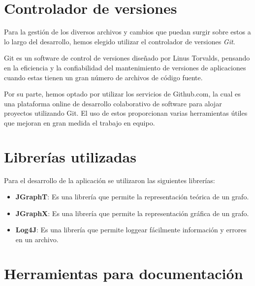 \documentclass{book}
\begin{document}
\section{Controlador de versiones}

Para la gestión de los diversos archivos y cambios que puedan surgir sobre estos a lo largo del desarrollo, hemos elegido utilizar el controlador de versiones \textit{Git}. 
\par
Git es un software de control de versiones diseñado por Linus Torvalds, pensando en la eficiencia y la confiabilidad del mantenimiento de versiones de aplicaciones cuando estas tienen un gran número de archivos de código fuente.
\par
Por su parte, hemos optado por utilizar los servicios de Github.com, la cual es una plataforma online de desarrollo colaborativo de software para alojar proyectos utilizando Git. El uso de estos proporcionan varias herramientas útiles que mejoran en gran medida el trabajo en equipo.
\medskip

\section{Librerías utilizadas}
Para el desarrollo de la aplicación se utilizaron las siguientes librerías:
\begin{itemize}
		\renewcommand{\labelitemi}{\scriptsize\tiny$\blacksquare$} 
		\itemsep=10pt \topsep=0pt \partopsep=0pt \parskip=0pt \parsep=10pt
		
		\item \textbf{JGraphT}: Es una librería que permite la representación teórica de un grafo.
		
		\item \textbf{JGraphX}: Es una librería que permite la representación gráfica de un grafo.

		\item \textbf{Log4J}: Es una librería que permite loggear fácilmente información y errores en un archivo. 

	\end{itemize}


\section{Herramientas para documentación}
\end{document}
